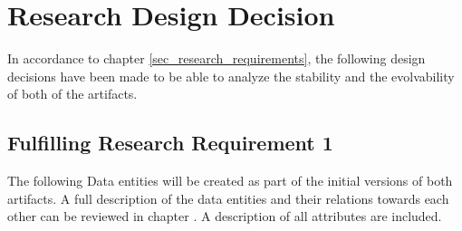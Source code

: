 \section{Research Design Decision} \label{sec_research_design_decisions}

In accordance to chapter \ref{sec_research_requirements}, the following design decisions
have been made to be able to analyze the stability and the evolvability of both
of the artifacts.

\subsection{Fulfilling Research Requirement 1}
The following Data entities will be created as part of the initial versions of both
artifacts. A full description of the data entities and their relations towards each other
can be reviewed in chapter . A description of all
attributes are included.

